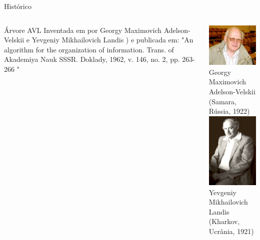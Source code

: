 \documentclass[12pt,table,xcolor={dvipsnames}]{beamer}
\begin{document}
\begin{frame}[fragile]{Histórico}
\begin{columns}
\begin{block}{Árvore AVL}
Inventada em por Georgy Maximovich Adelson-Velskii e Yevgeniy Mikhailovich Landis ) e publicada em: "An algorithm for the organization of information. Trans. of Akademiya Nauk SSSR. Doklady, 1962, v. 146, no. 2, pp. 263-266 " 
\end{block}
\begin{center}
\includegraphics[scale=0.3]{av.png}\\ 
Georgy Maximovich Adelson-Velskii (Samara, Rússia, 1922)\\
\includegraphics[scale=.2]{l.png}\\ 
Yevgeniy Mikhailovich Landis (Kharkov, Ucrânia, 1921)
\end{center}
\end{columns}          
\end{frame}
\end{document}
